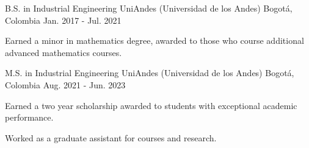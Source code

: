 

\begin{cventries}

  \cventry
    {B.S. in Industrial Engineering} %
    {UniAndes (Universidad de los Andes)} %
    {Bogotá, Colombia} %
    {Jan. 2017 - Jul. 2021} %
    {
      \begin{cvitems} %
        \item {Earned a minor in mathematics degree, awarded to those who course additional advanced mathematics courses.}
      \end{cvitems}
    }

  \cventry
    {M.S. in Industrial Engineering} %
    {UniAndes (Universidad de los Andes)} %
    {Bogotá, Colombia} %
    {Aug. 2021 - Jun. 2023} %
    {
      \begin{cvitems} %
        \item {Earned a two year scholarship awarded to students with exceptional academic performance.}
        \item {Worked as a graduate assistant for courses and research.}
      \end{cvitems}
    }

\end{cventries}
